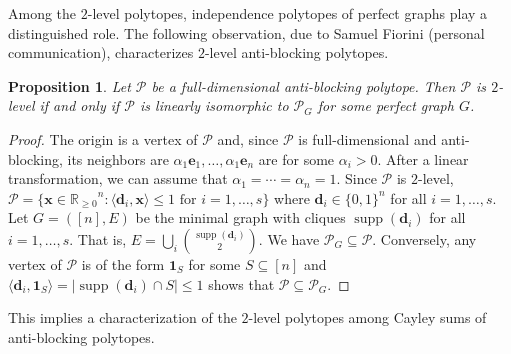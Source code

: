 \documentclass[11pt]{amsart}
\newtheorem{prop}[thm]{Proposition}
\theoremstyle{definition}
\begin{document}
Among the $2$-level polytopes, independence polytopes of perfect graphs play a
distinguished role.  The following observation, due to Samuel Fiorini
(personal communication), characterizes $2$-level anti-blocking polytopes.
\begin{prop}\label{prop:Sam}
    Let ${\mathcal{P}}$ be a full-dimensional anti-blocking polytope. Then ${\mathcal{P}}$ is
    $2$-level if and only if ${\mathcal{P}}$ is linearly isomorphic to ${\mathcal{P}}_G$ for some
    perfect graph $G$.
\end{prop}
\begin{proof}
    The origin is a vertex of ${\mathcal{P}}$ and, since ${\mathcal{P}}$ is full-dimensional and
    anti-blocking, its neighbors are $ \alpha_1 {\mathbf{e}}_1, \dots, \alpha_1 {\mathbf{e}}_n$
    are for some $\alpha_i > 0$. After a linear transformation, we can assume
    that $\alpha_1 = \cdots = \alpha_n = 1$. Since ${\mathcal{P}}$ is $2$-level, ${\mathcal{P}} =
    \{ {\mathbf{x}} \in {{\mathbb{R}}_{\ge0}}^n : {\langle{{{\mathbf{d}}_i, {\mathbf{x}}}}\rangle} \le 1 \text{ for } i=1,\dots,s\}$
    where ${\mathbf{d}}_i \in \{0,1\}^n$ for all $i=1,\dots,s$. Let $G = ([n],E)$ be the
    minimal graph with cliques $\operatorname{supp}({\mathbf{d}}_i)$ for all $i=1,\dots,s$. That is,
    $E = \bigcup_i \binom{\operatorname{supp}({\mathbf{d}}_i)}{2}$. We have ${\mathcal{P}}_G \subseteq {\mathcal{P}}$.
    Conversely, any vertex of ${\mathcal{P}}$ is of the form ${\mathbf{1}}_S$ for some $S
    \subseteq [n]$ and ${\langle{{{\mathbf{d}}_i,{\mathbf{1}}_S}}\rangle} = |\operatorname{supp}({\mathbf{d}}_i) \cap S| \le 1$ shows
    that ${\mathcal{P}} \subseteq {\mathcal{P}}_G$. 
\end{proof}

This implies a characterization of the $2$-level polytopes among Cayley
sums of anti-blocking polytopes.
\end{document}
